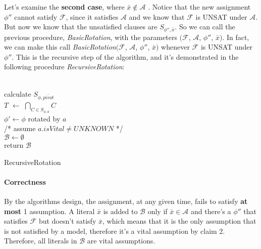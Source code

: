 \documentclass[]{article}
\begin{document}
 
 	 Let's examine the \textbf{second case}, where $ \bar{x} \notin \mathcal{A} $ . Notice that the new assignment $ \phi'' $ cannot satisfy $ \mathcal{F} $, since it satisfies $ \mathcal{A} $ and we know that $ \mathcal{F} $ is UNSAT under $ \mathcal{A} $. But now we know that the unsatisfied clauses are $ S_{\phi'',\bar{x}} $. So we can call the previous procedure, \textit{BasicRotation}, with the parameters $ (\mathcal{F} $, $ \mathcal{A} $, $ \phi'' $, $ \bar{x} )$. In fact, we can make this call \textit{BasicRotation}$ (\mathcal{F} $, $ \mathcal{A} $, $ \phi'' $, $ \bar{x} )$ whenever 
	$ \mathcal{F} $ is UNSAT under $ \phi'' $. This is the recursive step of the algorithm, and it's demonstrated in the following procedure \textit{RecursiveRotation}:\\\\
	\begin{algorithm}[H]
		calculate $ S_{\phi,\bar{pivot}} $\\
		$ T $ $ \leftarrow $ $ \bigcap_{C \in S_{\phi,\bar{a}}} C $\\
		$ \phi' \leftarrow \phi $ rotated by $ a $\\
		/* assume $ a.isVital \neq UNKNOWN $ */ \\
		$ \mathcal{B} \leftarrow \emptyset $  \\
		return $ \mathcal{B} $
		\caption{RecursiveRotation}
	\end{algorithm}

	\paragraph{Correctness} By the algorithms design, the assignment, at any given time, fails to satisfy \textbf{at most} 1 assumption. A literal $ \bar{x} $ is added to $ \mathcal{B} $ only if  $ \bar{x} \in \mathcal{A} $ and there's a $ \phi'' $ that satisfies $ \mathcal{F} $ but doesn't satisfy $ \bar{x} $, which means that it is the only assumption that is not satisfied by a model, therefore it's a vital assumption by claim 2. Therefore, all literals in $ \mathcal{B} $ are vital assumptions.
\end{document}

